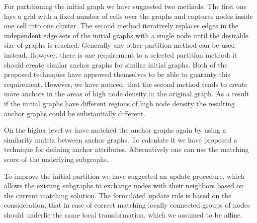 For partitioning the initial graph we have suggested two methods. The first one lays a grid with a fixed number of cells over the graphs and captures nodes inside one cell into one cluster. The second method iteratively replaces edges in the independent edge sets of the initial graphs with a single node until the desirable size of graphs is reached. Generally any other partition method can be used instead. However, there is one requirement to a selected partition method: it should create similar anchor graphs for similar initial graphs. Both of the proposed techniques have approved themselves to be able to guaranty this requirement. However, we have noticed, that the second method tends to create more anchors in the areas of high node density in the original graph. As a result if the initial graphs have different regions of high node density the resulting anchor graphs could be substantially different.

On the higher level we have matched the anchor graphs again by using a similarity matrix between anchor graphs. To calculate it we have proposed a technique for defining anchor attributes. Alternatively one can use the matching score of the underlying subgraphs. 

To improve the initial partition we have suggested an update procedure, which allows the existing subgraphs to exchange nodes with their neighbors based on the current matching solution. The formulated update rule is based on the consideration, that in case of correct matching locally connected groups of nodes should underlie the same local transformation, which we assumed to be affine.

